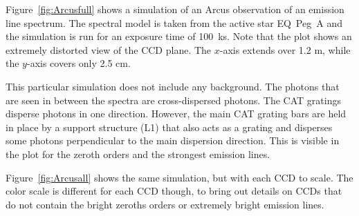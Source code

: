 \documentclass[linenumbers]{aastex631}
\begin{document}
\begin{figure*}
    \caption{Simulation of an Arcus observation of an emission lines spectrum (see section~\ref{sect:applications} for details). Position of the CCDs are outlined with a white frame and the zeros orders are indicated. Dashed arrows mark the dispersion direction of the four orders from the zeroths order. Only photons that are detected on a CCD are included. Note that the dispersion and cross-dispersion directions are scaled differently.
        }
    \label{fig:Arcusfull}
\end{figure*}

Figure~\ref{fig:Arcusfull} shows a simulation of an Arcus observation of an emission line spectrum. The spectral model is taken from the active star EQ~Peg~A \citep{2008A&A...491..859L} and the simulation is run for an exposure time of 100~ks. Note that the plot shows an extremely distorted view of the CCD plane. The $x$-axis extends over 1.2 m, while the $y$-axis covers only 2.5 cm.

This particular simulation does not include any background. The photons that are seen in between the spectra are cross-dispersed photons. The CAT gratings disperse photons in one direction. However, the main CAT grating bars are held in place by a support structure (L1) that also acts as a grating and disperses some photons perpendicular to the main dispersion direction. This is visible in the plot for the zeroth orders and the strongest emission lines.


\begin{figure*}
    \caption{Images of the 16 individual Arcus CCDs are shown for the same simulation as in figure~\ref{fig:Arcusfull}. Note that the color scale is chosen differently for each chip.
        }
    \label{fig:Arcusall}
\end{figure*}

Figure~\ref{fig:Arcusall} shows the same simulation, but with each CCD to scale. The color scale is different for each CCD though, to bring out details on CCDs that do not contain the bright zeroths orders or extremely bright emission lines.




\end{document}
